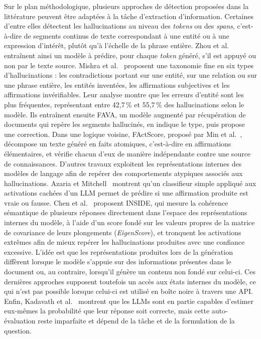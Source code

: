 Sur le plan méthodologique, plusieurs approches de détection proposées dans la littérature peuvent être adaptées à la tâche d'extraction d'information. Certaines d'entre elles détectent les hallucinations au niveau des \textit{tokens} ou des \textit{spans}, c'est-à-dire de segments continus de texte correspondant à une entité ou à une expression d'intérêt, plutôt qu'à l'échelle de la phrase entière. Zhou et al.~\cite{zhou2021detecting} entraînent ainsi un modèle à prédire, pour chaque \textit{token} généré, s'il est appuyé ou non par le texte source. Mishra et al.~\cite{mishra2024fava} proposent une taxonomie fine en six types d'hallucinations : les contradictions portant sur une entité, sur une relation ou sur une phrase entière, les entités inventées, les affirmations subjectives et les affirmations invérifiables. Leur analyse montre que les erreurs d'entité sont les plus fréquentes, représentant entre 42,7\,\% et 55,7\,\% des hallucinations selon le modèle. Ils entraînent ensuite FAVA, un modèle augmenté par récupération de documents qui repère les segments hallucinés, en indique le type, puis propose une correction. Dans une logique voisine, FActScore, proposé par Min et al.~\cite{min2023factscore}, décompose un texte généré en faits atomiques, c'est-à-dire en affirmations élémentaires, et vérifie chacun d'eux de manière indépendante contre une source de connaissances. D'autres travaux exploitent les représentations internes des modèles de langage afin de repérer des comportements atypiques associés aux hallucinations. Azaria et Mitchell~\cite{azaria2023internal} montrent qu'un classifieur simple appliqué aux activations cachées d'un LLM permet de prédire si une affirmation produite est vraie ou fausse. Chen et al.~\cite{chen2024inside} proposent INSIDE, qui mesure la cohérence sémantique de plusieurs réponses directement dans l'espace des représentations internes du modèle, à l'aide d'un score fondé sur les valeurs propres de la matrice de covariance de leurs plongements (\textit{EigenScore}), et tronquent les activations extrêmes afin de mieux repérer les hallucinations produites avec une confiance excessive. L'idée est que les représentations produites lors de la génération diffèrent lorsque le modèle s'appuie sur des informations présentes dans le document ou, au contraire, lorsqu'il génère un contenu non fondé sur celui-ci. Ces dernières approches supposent toutefois un accès aux états internes du modèle, ce qui n'est pas possible lorsque celui-ci est utilisé en boîte noire à travers une API. Enfin, Kadavath et al.~\cite{kadavath2022know} montrent que les LLMs sont en partie capables d'estimer eux-mêmes la probabilité que leur réponse soit correcte, mais cette auto-évaluation reste imparfaite et dépend de la tâche et de la formulation de la question.


